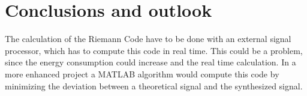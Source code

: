 \chapter{Conclusions and outlook}
The calculation of the Riemann Code have to be done with an external signal processor, which has to compute this code in real time. 
This could be a problem, since the energy consumption could increase and the real time calculation.
 In a more enhanced project a MATLAB algorithm would compute this code by minimizing the deviation between a theoretical signal and the synthesized signal.